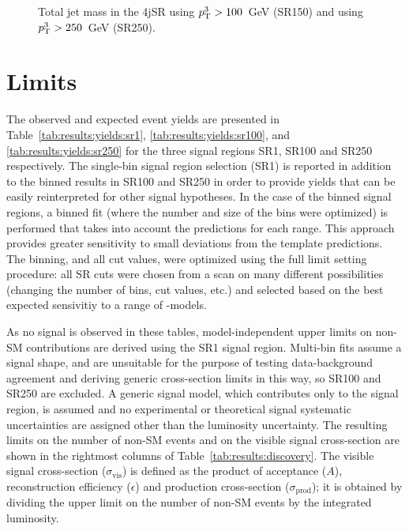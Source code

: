 \begin{figure}[!ht]
  \centering
  \caption{Total jet mass in the 4jSR using $p_{\text{T}}^{3}>100$~GeV (SR150) and  using $p_{\text{T}}^{3}>250$~GeV (SR250).}
  \label{fig:search:search:4jsr:Total}
\end{figure}


\FloatBarrier



\section{Limits}


The observed and expected event yields are presented in Table~\ref{tab:results:yields:sr1}, \ref{tab:results:yields:sr100}, and \ref{tab:results:yields:sr250} for the three signal regions SR1, SR100 and SR250 respectively. The single-bin signal region selection (SR1) is reported in addition to the binned \MJ results in SR100 and SR250 in order to provide yields that can be easily reinterpreted for other signal hypotheses. In the case of the binned \MJ signal regions, a binned fit (where the number and size of the bins were optimized) is performed that takes into account the predictions for each \MJ range. This approach provides greater sensitivity to small deviations from the template predictions. The binning, and all cut values, were optimized using the full limit setting procedure: all SR cuts were chosen from a scan on many different possibilities (changing the number of bins, cut values, etc.) and selected based on the best expected sensivitiy to a range of \gluino-\lsp models.



As no signal is observed in these tables, model-independent upper limits on non-SM contributions are derived using the SR1 signal region. Multi-bin fits assume a signal shape, and are unsuitable for the purpose of testing data-background agreement and deriving generic cross-section limits in this way, so SR100 and SR250 are excluded. A generic signal model, which contributes only to the signal region, is assumed and no experimental or theoretical signal systematic uncertainties are assigned other than the luminosity uncertainty. The resulting limits on the number of non-SM events and on the visible signal cross-section are shown in the rightmost columns of Table~\ref{tab:results:discovery}. The visible signal cross-section ($\sigma_\text{vis}$) is defined as the product of acceptance ($A$), reconstruction efficiency ($\epsilon$) and production cross-section ($\sigma_\text{prod}$); it is obtained by dividing the upper limit on the number of non-SM events by the integrated luminosity. 


